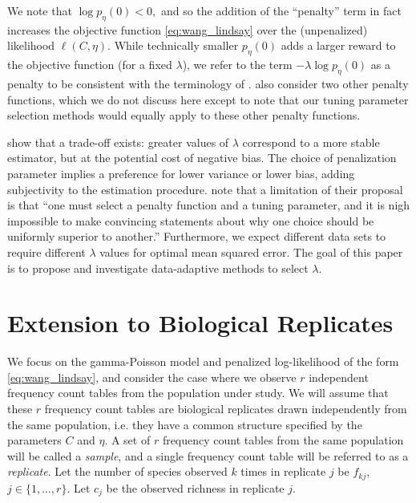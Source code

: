 \documentclass[12pt]{article}
\begin{document}
We note that $\log p_{\eta}(0) < 0,$ and so the addition of the ``penalty'' term in fact increases the objective function \eqref{eq:wang_lindsay} over the (unpenalized) likelihood $\ell(C,\eta)$.
While technically smaller $p_{\eta}(0)$ adds a larger reward to the objective function (for a fixed $\lambda$), we refer to the term $ - \lambda \log p_{\eta}(0)$ as a penalty
to be consistent with the terminology of \citet{wang_2005}.
\citet{wang_2005} also consider two other penalty functions, which we do not discuss here except to note that our tuning parameter selection methods would equally apply to these other penalty functions.

\citet{wang_2005} show that a trade-off exists: greater values of $\lambda$ correspond to a more stable estimator, but at the potential cost of negative bias.
The choice of penalization parameter implies a preference for lower variance or lower bias, adding subjectivity to the estimation procedure.
\citet{wang_2005} note that a limitation of their proposal is that ``one must select a penalty function and a tuning parameter, and it is nigh impossible to make convincing statements about why one choice should be uniformly superior to another.''
Furthermore, we expect different data sets to require different $\lambda$ values for optimal mean squared error.
The goal of this paper is to propose and investigate data-adaptive methods to select $\lambda$.


\section{Extension to Biological Replicates}
\label{sec:fixed_lambda}

We focus on the gamma-Poisson model and penalized log-likelihood of the form \eqref{eq:wang_lindsay}, and consider the case where we observe $r$ independent frequency count tables from the population under study.
We will assume that these $r$ frequency count tables are biological replicates drawn independently from the same population, i.e. they have a common structure specified by the parameters $C$ and $\eta$.  A set of $r$ frequency count tables from the same population will be called a \textit{sample}, and a single frequency count table will be referred to as a \textit{replicate}.  Let the number of species observed $k$ times in replicate $j$ be $f_{kj}$, $j \in \{1, \dots , r\}$.  Let $c_j$ be the observed richness in replicate $j$.
\end{document}
